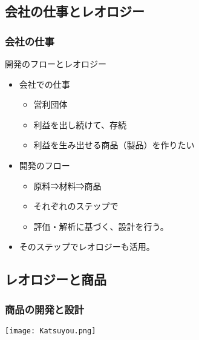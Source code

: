 \documentclass[12pt, dvipdfmx]{beamer}
\begin{document}
\subsection{会社の仕事とレオロジー}
\begin{frame}
	\frametitle{会社の仕事}
	\begin{block}{開発のフローとレオロジー}	
		\begin{itemize}
			\item 会社での仕事
				\begin{itemize}
					\item 営利団体
					\item 利益を出し続けて、存続
					\item 利益を⽣み出せる商品（製品）を作りたい
				\end{itemize}
			\item 開発のフロー
				\begin{itemize}
					\item 原料⇒材料⇒商品
					\item それぞれのステップで
					\item 評価・解析に基づく、設計を⾏う。
				\end{itemize}
			\item そのステップでレオロジーも活⽤。
		\end{itemize}
	\end{block}
\end{frame}

\subsection{レオロジーと商品}
\begin{frame}
	\frametitle{商品の開発と設計}
	\begin{center}
		\texttt{[image: Katsuyou.png]}
	\end{center}
\end{frame}
\end{document}
